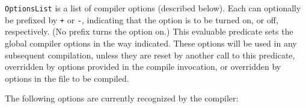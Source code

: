 \begin{description}
    {\tt OptionsList} is a list of compiler options (described below).
    Each can optionally be prefixed by \verb|+| or \verb|-|,
    indicating that the option is to be turned on, or off,
    respectively.  (No prefix turns the option on.)  This evaluable
    predicate sets the global compiler options in the way indicated.
    These options will be used in any subsequent compilation, unless
    they are 
    reset by another call to this predicate, overridden by options
    provided in the compile invocation, or overridden by options in
    the file to be compiled.
\end{description}

The following options are currently recognized by the compiler:
